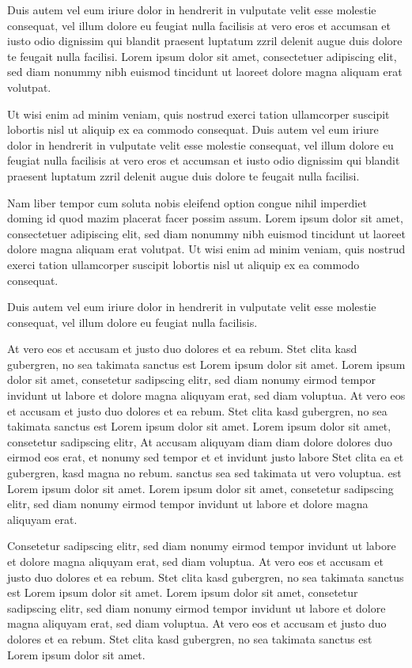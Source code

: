 \documentclass[a4paper]{article}
\begin{document}
Duis autem vel eum iriure dolor in hendrerit in vulputate velit esse molestie
consequat, vel illum dolore eu feugiat nulla facilisis at vero eros et accumsan
et iusto odio dignissim qui blandit praesent luptatum zzril delenit augue duis
dolore te feugait nulla facilisi. Lorem ipsum dolor sit amet, consectetuer
adipiscing elit, sed diam nonummy nibh euismod tincidunt ut laoreet dolore
magna aliquam erat volutpat.

Ut wisi enim ad minim veniam, quis nostrud exerci tation ullamcorper suscipit
lobortis nisl ut aliquip ex ea commodo consequat. Duis autem vel eum iriure
dolor in hendrerit in vulputate velit esse molestie consequat, vel illum dolore
eu feugiat nulla facilisis at vero eros et accumsan et iusto odio dignissim qui
blandit praesent luptatum zzril delenit augue duis dolore te feugait nulla
facilisi.

Nam liber tempor cum soluta nobis eleifend option congue nihil imperdiet doming
id quod mazim placerat facer possim assum. Lorem ipsum dolor sit amet,
consectetuer adipiscing elit, sed diam nonummy nibh euismod tincidunt ut
laoreet dolore magna aliquam erat volutpat. Ut wisi enim ad minim veniam, quis
nostrud exerci tation ullamcorper suscipit lobortis nisl ut aliquip ex ea
commodo consequat.

Duis autem vel eum iriure dolor in hendrerit in vulputate velit esse molestie
consequat, vel illum dolore eu feugiat nulla facilisis.

At vero eos et accusam et justo duo dolores et ea rebum. Stet clita kasd
gubergren, no sea takimata sanctus est Lorem ipsum dolor sit amet. Lorem ipsum
dolor sit amet, consetetur sadipscing elitr, sed diam nonumy eirmod tempor
invidunt ut labore et dolore magna aliquyam erat, sed diam voluptua. At vero
eos et accusam et justo duo dolores et ea rebum. Stet clita kasd gubergren, no
sea takimata sanctus est Lorem ipsum dolor sit amet. Lorem ipsum dolor sit amet,
consetetur sadipscing elitr, At accusam aliquyam diam diam dolore dolores duo
eirmod eos erat, et nonumy sed tempor et et invidunt justo labore Stet clita ea
et gubergren, kasd magna no rebum. sanctus sea sed takimata ut vero voluptua.
est Lorem ipsum dolor sit amet. Lorem ipsum dolor sit amet, consetetur
sadipscing elitr, sed diam nonumy eirmod tempor invidunt ut labore et dolore
magna aliquyam erat.

Consetetur sadipscing elitr, sed diam nonumy eirmod tempor invidunt ut labore
et dolore magna aliquyam erat, sed diam voluptua. At vero eos et accusam et
justo duo dolores et ea rebum. Stet clita kasd gubergren, no sea takimata
sanctus est Lorem ipsum dolor sit amet. Lorem ipsum dolor sit amet, consetetur
sadipscing elitr, sed diam nonumy eirmod tempor invidunt ut labore et dolore
magna aliquyam erat, sed diam voluptua. At vero eos et accusam et justo duo
dolores et ea rebum. Stet clita kasd gubergren, no sea takimata sanctus est
Lorem ipsum dolor sit amet.
\end{document}
